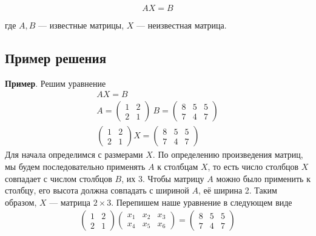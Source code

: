 \documentclass[]{article}
\begin{document}
\begin{equation}
	AX=B
\end{equation}

где $A,B$ --- известные матрицы, $X$ --- неизвестная матрица.

\subsection{Пример решения}
\textbf{Пример}. Решим уравнение 
\begin{gather*}
	AX=B
	\\
	A=
	\begin{pmatrix}
		1 & 2
		\\
		2 & 1
	\end{pmatrix}
\
B=
	\begin{pmatrix}
	8 & 5 & 5
	\\
	7 & 4 & 7
\end{pmatrix}
\\
\begin{pmatrix}
	1 & 2
	\\
	2 & 1
\end{pmatrix}
X
=
	\begin{pmatrix}
	8 & 5 & 5
	\\
	7 & 4 & 7
\end{pmatrix}
\end{gather*}
Для начала определимся с размерами $X$. По определению произведения матриц, мы будем последовательно применять $A$ к столбцам $X$, то есть число столбцов $X$ совпадает с числом столбцов $B$, их 3. Чтобы матрицу $A$ можно было применить к столбцу, его высота должна совпадать с шириной $A$, её ширина 2. Таким образом, $X$ --- матрица $2\times 3$. Перепишем наше уравнение в следующем виде
\begin{gather*}
	\begin{pmatrix}
		1 & 2
		\\
		2 & 1
	\end{pmatrix}
	\begin{pmatrix}
	x_1 & x_2 & x_3
	\\
	x_4 & x_5 & x_6
\end{pmatrix}
	=
	\begin{pmatrix}
		8 & 5 & 5
		\\
		7 & 4 & 7
	\end{pmatrix}
\end{gather*}
\end{document}
